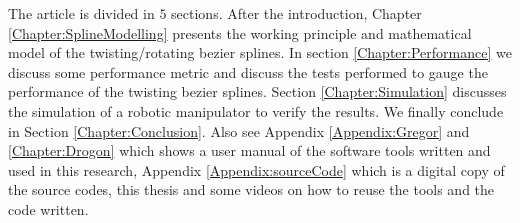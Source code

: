 {    The article is divided in $5$ sections. After the introduction, Chapter \ref{Chapter:SplineModelling} presents the working principle and mathematical model of the twisting/rotating bezier splines. In section \ref{Chapter:Performance} we discuss some performance metric and discuss the tests performed to gauge the performance of the twisting bezier splines. Section \ref{Chapter:Simulation} discusses the simulation of a robotic manipulator to verify the results. We finally conclude in Section \ref{Chapter:Conclusion}. Also see Appendix \ref{Appendix:Gregor} and \ref{Chapter:Drogon} which shows a user manual of the software tools written and used in this research, Appendix \ref{Appendix:sourceCode} which is a digital copy of the source codes, this thesis and some videos on how to reuse the tools and the code written.
} 